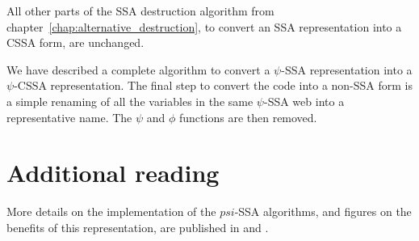 All other parts of the SSA destruction algorithm from
chapter~\ref{chap:alternative_destruction}, to convert an SSA
representation into a CSSA form, are unchanged.

We have described a complete algorithm to convert a $\psi$-SSA
representation into a $\psi$-CSSA representation. The final step to
convert the code into a non-SSA form is a simple renaming of all the
variables in the same $\psi$-SSA web into a representative name. The
$\psi$ and $\phi$ functions are then removed.






\section{Additional reading}

More details on the implementation of the $psi$-SSA algorithms, and
figures on the benefits of this representation, are published in
\cite{Stouchinin2001} and \cite{deferriere2006}.
